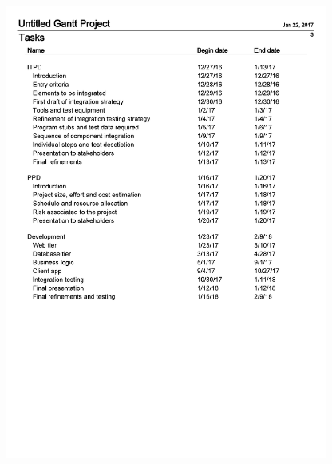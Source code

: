 \begin{figure}[H]
	\centerline{
		\includegraphics[width=400px]{../Datas/schedule-dates-2.pdf}
	}
		\label{fig:tasks-2}
\end{figure}
